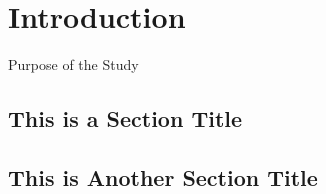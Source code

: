 \chapter{Introduction}

\begin{center}
	Purpose of the Study
\end{center}

\section{This is a Section Title}
\lipsum[2-4]

\section{This is Another Section Title}
\lipsum[2-4]